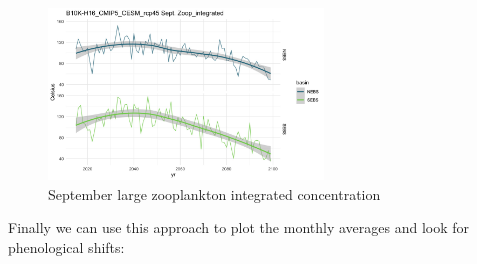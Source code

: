 \documentclass[
]{article}
\begin{document}
\begin{figure}
\centering
\includegraphics[width=0.65\textwidth,height=\textheight]{Figs/Sept_large_Zoop.jpg}
\caption{September large zooplankton integrated concentration}
\end{figure}

Finally we can use this approach to plot the monthly averages and look
for phenological shifts:
\end{document}
